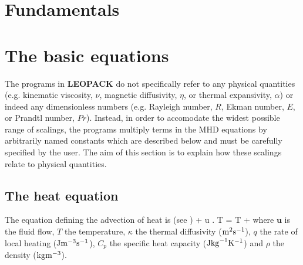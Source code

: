 \section{Fundamentals}
\label{chap:fundamentals}

\section{ The basic equations }

The programs in {\bf LEOPACK} do not specifically
refer to any physical quantities (e.g. kinematic viscosity, $\nu$,
magnetic diffusivity, $\eta$, or thermal expansivity, $\alpha$)
or indeed any dimensionless numbers (e.g. Rayleigh number, $R$,
Ekman number, $E$, or Prandtl number, $Pr$).
Instead, in order to accomodate the widest possible range of
scalings, the programs multiply terms in the MHD equations by
arbitrarily named constants which are described below and
must be carefully specified by the user.
The aim of this section is to explain how these
scalings relate to physical quantities.

\subsection{ The heat equation }
\label{subsec:heateq}

The equation defining the advection of heat is
(see \cite{gubrob87})
\beq
{} + {\bm u} . \nabla T = \kappa \Lap T 
                                        + 
\label{eq:gubrobheat}
\eeq
where ${\bm u}$ is the fluid flow, $T$ the
temperature, $\kappa$ the thermal diffusivity
(${\rm m}^2{\rm s}^{-1}$),
$q$ the rate of local heating
(${\rm J}{\rm m}^{-3}{\rm s}^{-1}$),
$C_{p}$ the specific heat capacity (${\rm J}{\rm kg}^{-1}{\rm K}^{-1}$)
and $\rho$ the density (${\rm kg}{\rm m}^{-3}$).

